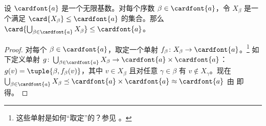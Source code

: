 \documentclass[../../../include/open-logic-section]{subfiles}
\begin{document}
\begin{prop}
设 $\cardfont{a}$ 是一个无限基数。对每个序数 $\beta
\in \cardfont{a}$，令 $X_\beta$ 是一个满足 $\card{X_\beta} \leq
\cardfont{a}$ 的集合。那么 $\card{\bigcup_{\beta \in \cardfont{a}} X_\beta}
\leq \cardfont{a}$。
\end{prop}

\begin{proof}
对每个 $\beta \in \cardfont{a}$，取定一个单射 $f_\beta \colon
X_\beta \to \cardfont{a}$。\footnote{这些单射是如何“取定”的？参见 。} 如下定义单射 $g \colon
\bigcup_{\beta \in \cardfont{a}} X_\beta \to \cardfont{a} \times
\cardfont{a}$：$g(v) = \tuple{\beta, f_\beta(v)}$，其中 $v \in
X_\beta$ 且对任意 $\gamma \in \beta$ 有 $v \notin X_\gamma$。现在
$\bigcup_{\beta \in \cardfont{a}} X_\beta \preceq \cardfont{a} \times
\cardfont{a} \approx \cardfont{a}$ 由  即得。
\end{proof}
\end{document}
